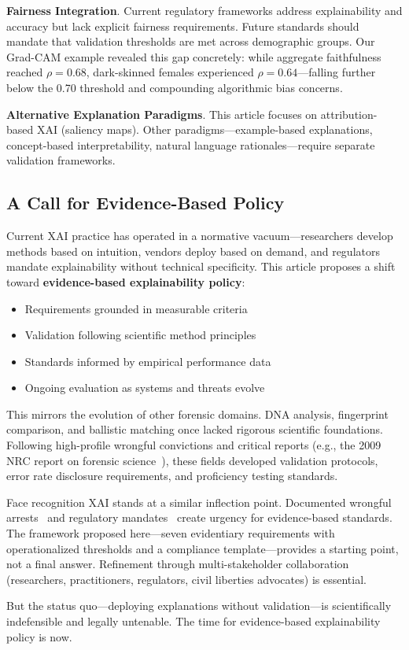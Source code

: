 \textbf{Fairness Integration}. Current regulatory frameworks address explainability and accuracy but lack explicit fairness requirements. Future standards should mandate that validation thresholds are met across demographic groups. Our Grad-CAM example revealed this gap concretely: while aggregate faithfulness reached $\rho = 0.68$, dark-skinned females experienced $\rho = 0.64$—falling further below the 0.70 threshold and compounding algorithmic bias concerns.

\textbf{Alternative Explanation Paradigms}. This article focuses on attribution-based XAI (saliency maps). Other paradigms—example-based explanations, concept-based interpretability, natural language rationales—require separate validation frameworks.

\subsection{A Call for Evidence-Based Policy}

Current XAI practice has operated in a normative vacuum—researchers develop methods based on intuition, vendors deploy based on demand, and regulators mandate explainability without technical specificity. This article proposes a shift toward \textbf{evidence-based explainability policy}:

\begin{itemize}[itemsep=2pt]
    \item Requirements grounded in measurable criteria
    \item Validation following scientific method principles
    \item Standards informed by empirical performance data
    \item Ongoing evaluation as systems and threats evolve
\end{itemize}

This mirrors the evolution of other forensic domains. DNA analysis, fingerprint comparison, and ballistic matching once lacked rigorous scientific foundations. Following high-profile wrongful convictions and critical reports (e.g., the 2009 NRC report on forensic science~\cite{nrc2009}), these fields developed validation protocols, error rate disclosure requirements, and proficiency testing standards.

Face recognition XAI stands at a similar inflection point. Documented wrongful arrests~\cite{hill2020williams,hill2023oliver} and regulatory mandates~\cite{euaiact2024,gdpr2016,daubert1993} create urgency for evidence-based standards. The framework proposed here—seven evidentiary requirements with operationalized thresholds and a compliance template—provides a starting point, not a final answer. Refinement through multi-stakeholder collaboration (researchers, practitioners, regulators, civil liberties advocates) is essential.

But the status quo—deploying explanations without validation—is scientifically indefensible and legally untenable. The time for evidence-based explainability policy is now.
